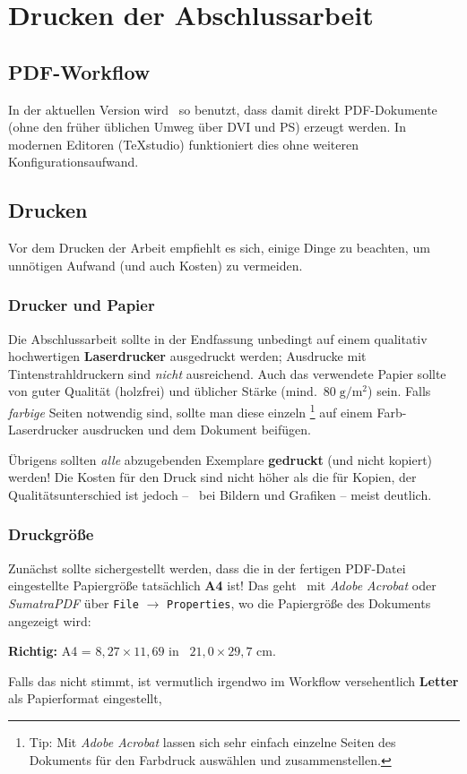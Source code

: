 \chapter{Drucken der Abschlussarbeit}
\label{cha:Drucken}


\section{PDF-Workflow}
\label{sec:pdf}

In der aktuellen Version wird \latex\ so benutzt, dass damit direkt PDF-Dokumente (ohne den früher üblichen Umweg über DVI und PS) erzeugt werden.
In modernen Editoren (\zB TeXstudio) funktioniert dies ohne weiteren Konfigurationsaufwand.%


\section{Drucken}

Vor dem Drucken der Arbeit empfiehlt es sich, einige Dinge zu beachten, um unnötigen Aufwand (und auch Kosten) zu vermeiden.

\subsection{Drucker und Papier}

Die Abschlussarbeit sollte in der Endfassung unbedingt auf einem
qualitativ hochwertigen \textbf{Laserdrucker} ausgedruckt werden; 
Ausdrucke mit Tintenstrahldruckern sind \emph{nicht} ausreichend. Auch das
verwendete Papier sollte von guter Qualität (holzfrei) und
üblicher Stärke (mind.\ $80\; {\mathrm g} / {\mathrm m}^2$) sein.
Falls \emph{farbige} Seiten notwendig sind, sollte man diese einzeln%
\footnote{Tip: Mit \emph{Adobe Acrobat} lassen sich sehr einfach einzelne Seiten
des Dokuments für den Farbdruck auswählen und zusammenstellen.}
auf einem Farb-Laserdrucker ausdrucken und dem Dokument beifügen.

Übrigens sollten \emph{alle} abzugebenden Exemplare \textbf{gedruckt} (und nicht kopiert) werden! Die Kosten für den Druck
sind nicht höher als die für Kopien, der
Qualitätsunterschied ist jedoch -- \va\ bei Bildern und Grafiken
-- meist deutlich.

\subsection{Druckgröße}

Zunächst sollte sichergestellt werden, dass die in der fertigen PDF-Datei eingestellte
Papiergröße tatsächlich \textbf{A4} ist! Das geht \zB\ mit \emph{Adobe Acrobat}
oder \emph{SumatraPDF}
über \texttt{File} $\rightarrow$ \texttt{Properties},
wo die Papiergröße des Dokuments angezeigt wird:
\begin{center}
\textbf{Richtig:} A4 = $8{,}27 \times 11{,}69$ in \bzw\ $21{,}0 \times 29{,}7$ cm.
\end{center}
Falls das nicht stimmt, ist vermutlich irgendwo im Workflow versehentlich \textbf{Letter} 
als Papierformat eingestellt, %


